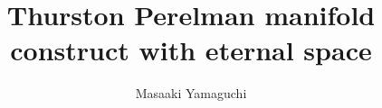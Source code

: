 \documentclass{jsarticle}
\begin{document}
\title{Thurston Perelman manifold construct with eternal space}
\author{Masaaki Yamaguchi}
\date{}
\maketitle
 \newcommand{\secproduct}{%
	 \begin{picture}(10,20)
		 \put(0,0){
			 $ \nabla $}
		 \put(5,0){+}
	 \end{picture} %
	 }


\newcommand{\variint}{%
	\begin{picture}(15,30)
		\put(0,0){
			$ \iint $}
		\put(0,5){\line(15,0){15}}
	\end{picture} %
}
   \newcommand{\squareiint}{%
	\begin{picture}(15,30)
		\put(0,0){
			$ \iint $}
		\put(0,5){$\text{\scalebox{2.0}[1]{$\square$}}$}
	\end{picture} %
}

  
   \newcommand{\dazanier}{%
	\begin{picture}(15,30)
		\put(0,0){
			$ \bigsqcup $}
		\put(4,3){$\text{\scalebox{1.0}[1]{$\top$}}$}
		\put(4,3){$\text{\scalebox{1.0}[1]{$\bot$}}$}
	\end{picture} %
}


\newcommand{\variiint}{%
	\begin{picture}(15,15)
		\put(0,0){
			$ \iiint $}
		\put(0,5){\line(15,0){20}}
	\end{picture} %
}



 \newcommand{\alearletter}{%
	 \begin{picture}(10,20)
		 \put(0,0){
			 $ \square $}
		 \put(0,0){\line(1,1){10}}
	 \end{picture} %
	 }

  \newcommand{\whitewithbodercircle}
  {\text{\textcircled{\phantom{\textbullet}}}
  \kern-0.9em\text{\textcircled{\phantom{}}}}
     

 
  \newcommand{\whitewithblack}{\text{\textcircled{\textbullet}}}
  \newcommand{\whitewithblacksquare}{\text{\fbox{\text{\rule{0.5em}
  {0.5em}}}}}
  \newcommand{\whitewithwhitesquare}{\text{\fbox{\text{\phantom
  {\rule{0.5em}{0.5em}}}}}}
 \newcommand{\whitewithbodercircleiiint}{%
	 \begin{picture}(30,45)
		 \put(0,0){\scalebox{2.0}[2]{$\whitewithbodercircle$}}
		 \put(0,0){\scalebox{2.0}[2]{$\iiint$}}
	 \end{picture}%
	 }
\newcommand{\whitewithbodercircleint}{%
	 \begin{picture}(30,45)
		 \put(0,0){\scalebox{2.0}[2]{$\whitewithbodercircle$}}
		 \put(0,0){\scalebox{2.0}[2]{$\int$}}
	 \end{picture}%
	 }
 \newcommand{\whitewithbodercirclevarint}{%
	 \begin{picture}(30,45)
		 \put(0,0){\scalebox{2.0}[2]{$\whitewithbodercircle$}}
		 \put(0,0){\scalebox{2.0}[2]{$\varint$}}
	 \end{picture}%
	 }
 
\end{document}
